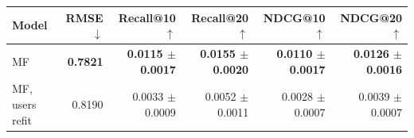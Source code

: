 \begin{tabular}{lrrrrr}
\toprule
Model & RMSE $\downarrow$ & Recall@10 $\uparrow$ & Recall@20 $\uparrow$ & NDCG@10 $\uparrow$ & NDCG@20 $\uparrow$ \\
\midrule
MF & \textbf{0.7821} & \textbf{0.0115 $\pm$ 0.0017} & \textbf{0.0155 $\pm$ 0.0020} & \textbf{0.0110 $\pm$ 0.0017} & \textbf{0.0126 $\pm$ 0.0016} \\
MF, users refit & 0.8190 & 0.0033 $\pm$ 0.0009 & 0.0052 $\pm$ 0.0011 & 0.0028 $\pm$ 0.0007 & 0.0039 $\pm$ 0.0007 \\
\bottomrule
\end{tabular}
